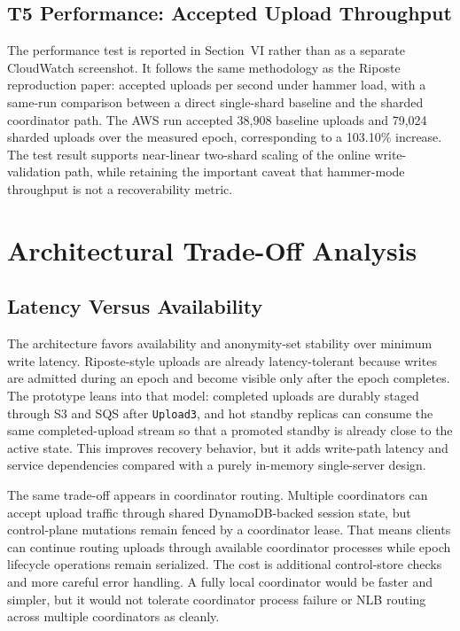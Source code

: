 \documentclass[conference]{IEEEtran}
\begin{document}
\subsection{T5 Performance: Accepted Upload Throughput}

The performance test is reported in Section~VI rather than as a separate CloudWatch screenshot. It follows the same methodology as the Riposte reproduction paper: accepted uploads per second under hammer load, with a same-run comparison between a direct single-shard baseline and the sharded coordinator path. The AWS run accepted 38,908 baseline uploads and 79,024 sharded uploads over the measured epoch, corresponding to a 103.10\% increase. The test result supports near-linear two-shard scaling of the online write-validation path, while retaining the important caveat that hammer-mode throughput is not a recoverability metric.

\section{Architectural Trade-Off Analysis}

\subsection{Latency Versus Availability}

The architecture favors availability and anonymity-set stability over minimum write latency. Riposte-style uploads are already latency-tolerant because writes are admitted during an epoch and become visible only after the epoch completes. The prototype leans into that model: completed uploads are durably staged through S3 and SQS after \texttt{Upload3}, and hot standby replicas can consume the same completed-upload stream so that a promoted standby is already close to the active state. This improves recovery behavior, but it adds write-path latency and service dependencies compared with a purely in-memory single-server design.

The same trade-off appears in coordinator routing. Multiple coordinators can accept upload traffic through shared DynamoDB-backed session state, but control-plane mutations remain fenced by a coordinator lease. That means clients can continue routing uploads through available coordinator processes while epoch lifecycle operations remain serialized. The cost is additional control-store checks and more careful error handling. A fully local coordinator would be faster and simpler, but it would not tolerate coordinator process failure or NLB routing across multiple coordinators as cleanly.
\end{document}

